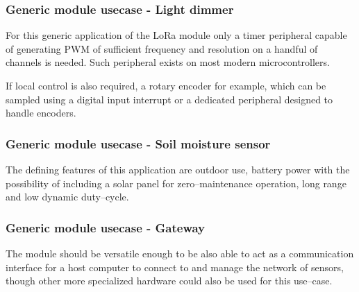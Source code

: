 \subsubsection{Generic module usecase - Light dimmer}
For this generic application of the LoRa module only a timer peripheral capable of generating PWM of sufficient frequency and resolution on a handful of channels is needed. Such peripheral exists on most modern microcontrollers.

If local control is also required, a rotary encoder for example, which can be sampled using a digital input interrupt or a dedicated peripheral designed to handle encoders.

\subsubsection{Generic module usecase - Soil moisture sensor}
The defining features of this application are outdoor use, battery power with the possibility of including a solar panel for zero--maintenance operation, long range and low dynamic duty--cycle.

\subsubsection{Generic module usecase - Gateway}
The module should be versatile enough to be also able to act as a communication interface for a host computer to connect to and manage the network of sensors, though other more specialized hardware could also be used for this use--case.

